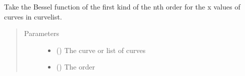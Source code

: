 \documentclass[letterpaper,10pt,english]{sphinxmanual}
\begin{document}

\begin{fulllineitems}
\label{\detokenize{pydv:pydvpy.jnx}}
Take the Bessel function of the first kind of the nth order for the x values of
curves in curvelist.
\begin{quote}\begin{description}
\item[{Parameters}] \leavevmode\begin{itemize}
\item {} 
 () \textendash{} The curve or list of curves

\item {} 
 () \textendash{} The order

\end{itemize}

\end{description}\end{quote}

\end{fulllineitems}

\end{document}
